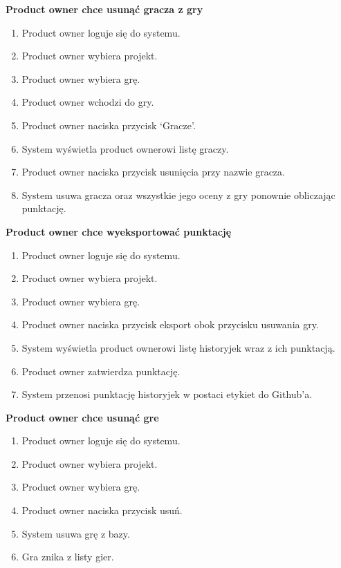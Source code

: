 \textbf{Product owner chce usunąć gracza z gry}
\begin{enumerate}
    \item Product owner loguje się do systemu.
    \item Product owner wybiera projekt.
    \item Product owner wybiera grę.
    \item Product owner wchodzi do gry.
    \item Product owner naciska przycisk `Gracze'.
    \item System wyświetla product ownerowi listę graczy.
    \item Product owner naciska przycisk usunięcia przy nazwie gracza.
    \item System usuwa gracza oraz wszystkie jego oceny z gry ponownie obliczając punktację.
\end{enumerate}
\textbf{Product owner chce wyeksportować punktację}
\begin{enumerate}
    \item Product owner loguje się do systemu.
    \item Product owner wybiera projekt.
    \item Product owner wybiera grę.
    \item Product owner naciska przycisk eksport obok przycisku usuwania gry.
    \item System wyświetla product ownerowi listę historyjek wraz z ich punktacją.
    \item Product owner zatwierdza punktację.
    \item System przenosi punktację historyjek w postaci etykiet do Github'a.
\end{enumerate}
\textbf{Product owner chce usunąć gre}
\begin{enumerate}
    \item Product owner loguje się do systemu.
    \item Product owner wybiera projekt.
    \item Product owner wybiera grę.
    \item Product owner naciska przycisk usuń.
    \item System usuwa grę z bazy.
    \item Gra znika z listy gier.
\end{enumerate}
